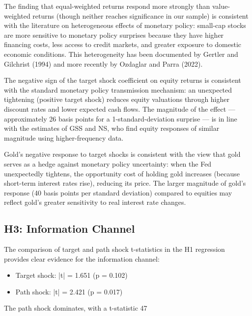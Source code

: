 \documentclass[12pt]{article}
\begin{document}
The finding that equal-weighted returns respond more strongly than value-weighted returns (though neither reaches significance in our sample) is consistent with the literature on heterogeneous effects of monetary policy: small-cap stocks are more sensitive to monetary policy surprises because they have higher financing costs, less access to credit markets, and greater exposure to domestic economic conditions. This heterogeneity has been documented by Gertler and Gilchrist (1994) and more recently by Ozdaglar and Parra (2022).

The negative sign of the target shock coefficient on equity returns is consistent with the standard monetary policy transmission mechanism: an unexpected tightening (positive target shock) reduces equity valuations through higher discount rates and lower expected cash flows. The magnitude of the effect --- approximately 26 basis points for a 1-standard-deviation surprise --- is in line with the estimates of GSS and NS, who find equity responses of similar magnitude using higher-frequency data.

Gold's negative response to target shocks is consistent with the view that gold serves as a hedge against monetary policy uncertainty: when the Fed unexpectedly tightens, the opportunity cost of holding gold increases (because short-term interest rates rise), reducing its price. The larger magnitude of gold's response (40 basis points per standard deviation) compared to equities may reflect gold's greater sensitivity to real interest rate changes.

\subsection{H3: Information Channel}

The comparison of target and path shock t-statistics in the H1 regression provides clear evidence for the information channel:

\begin{itemize}
\item Target shock: |t| = 1.651 (p = 0.102)
\item Path shock: |t| = 2.421 (p = 0.017)
\end{itemize}

The path shock dominates, with a t-statistic 47%
\end{document}
